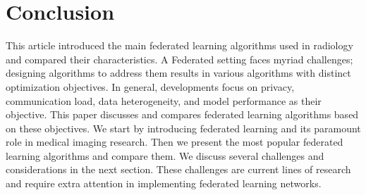 \section{Conclusion}
 

This article introduced the main federated learning algorithms used in radiology and compared their characteristics.  
A Federated setting faces myriad challenges; designing algorithms to address them results in various algorithms with distinct optimization objectives. In general, developments focus on privacy, communication load, data heterogeneity, and model performance as their objective. This paper discusses and compares federated learning algorithms based on these objectives. We start by introducing federated learning and its paramount role in medical imaging research. Then we present the most popular federated learning algorithms and compare them.
We discuss several challenges and considerations in the next section. These challenges are current lines of research and require extra attention in implementing federated learning networks.

\printbibliography

% 
%  
